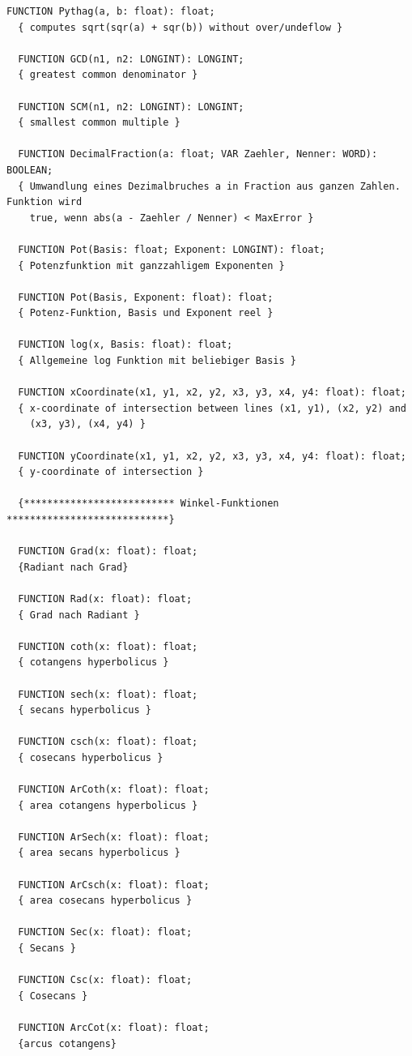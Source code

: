 \begin{refsection}
\begin{lstlisting}[caption=Interface of unit MathFunc]
  FUNCTION Pythag(a, b: float): float;
  { computes sqrt(sqr(a) + sqr(b)) without over/undeflow }

  FUNCTION GCD(n1, n2: LONGINT): LONGINT;
  { greatest common denominator }

  FUNCTION SCM(n1, n2: LONGINT): LONGINT;
  { smallest common multiple }

  FUNCTION DecimalFraction(a: float; VAR Zaehler, Nenner: WORD): BOOLEAN;
  { Umwandlung eines Dezimalbruches a in Fraction aus ganzen Zahlen. Funktion wird
    true, wenn abs(a - Zaehler / Nenner) < MaxError }

  FUNCTION Pot(Basis: float; Exponent: LONGINT): float;
  { Potenzfunktion mit ganzzahligem Exponenten }

  FUNCTION Pot(Basis, Exponent: float): float;
  { Potenz-Funktion, Basis und Exponent reel }

  FUNCTION log(x, Basis: float): float;
  { Allgemeine log Funktion mit beliebiger Basis }

  FUNCTION xCoordinate(x1, y1, x2, y2, x3, y3, x4, y4: float): float;
  { x-coordinate of intersection between lines (x1, y1), (x2, y2) and
    (x3, y3), (x4, y4) }

  FUNCTION yCoordinate(x1, y1, x2, y2, x3, y3, x4, y4: float): float;
  { y-coordinate of intersection }

  {************************** Winkel-Funktionen ****************************}

  FUNCTION Grad(x: float): float;
  {Radiant nach Grad}

  FUNCTION Rad(x: float): float;
  { Grad nach Radiant }

  FUNCTION coth(x: float): float;
  { cotangens hyperbolicus }

  FUNCTION sech(x: float): float;
  { secans hyperbolicus }

  FUNCTION csch(x: float): float;
  { cosecans hyperbolicus }

  FUNCTION ArCoth(x: float): float;
  { area cotangens hyperbolicus }

  FUNCTION ArSech(x: float): float;
  { area secans hyperbolicus }

  FUNCTION ArCsch(x: float): float;
  { area cosecans hyperbolicus }

  FUNCTION Sec(x: float): float;
  { Secans }

  FUNCTION Csc(x: float): float;
  { Cosecans }

  FUNCTION ArcCot(x: float): float;
  {arcus cotangens}


\end{lstlisting}
\end{refsection}
